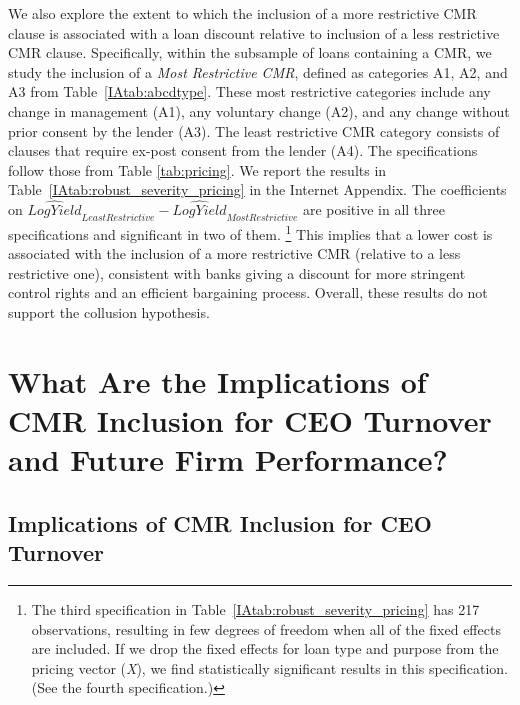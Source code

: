 \documentclass[a4paper,12pt]{article}
\begin{document}
We also explore the extent to which the inclusion of a more restrictive CMR clause is associated with a loan discount relative to inclusion of a less restrictive CMR clause.
Specifically, within the subsample of loans containing a CMR, we study the inclusion of a \textit{Most Restrictive CMR}, defined as categories A1, A2, and A3 from Table~\ref{IAtab:abcdtype}.
These most restrictive categories include any change in management (A1), any voluntary change (A2), and any change without prior consent by the lender (A3).
The least restrictive CMR category consists of clauses that require ex-post consent from the lender (A4).
The specifications follow those from Table \ref{tab:pricing}.
We report the results in Table~\ref{IAtab:robust_severity_pricing} in the Internet Appendix.
The coefficients on  $ \widehat{LogYield}_{Least Restrictive}-\widehat{LogYield}_{Most Restrictive} $ are  positive in all three specifications and significant in two of them.%
    \footnote{The third specification in Table~\ref{IAtab:robust_severity_pricing} has 217 observations, resulting in few degrees of freedom when all of the fixed effects are included. If we drop the fixed effects for loan type and purpose from the pricing vector (\textit{X}), we find statistically significant results in this specification. (See the fourth specification.)}
This implies that a lower cost is associated with the inclusion of a more restrictive CMR (relative to a less restrictive one), consistent with banks giving a discount for more stringent control rights and an efficient bargaining process.
Overall, these results do not support the collusion hypothesis.











\section{What Are the Implications of CMR Inclusion for CEO Turnover and Future Firm Performance?}
\label{section:turnover}

\subsection{Implications of CMR Inclusion for CEO Turnover}
\end{document}
